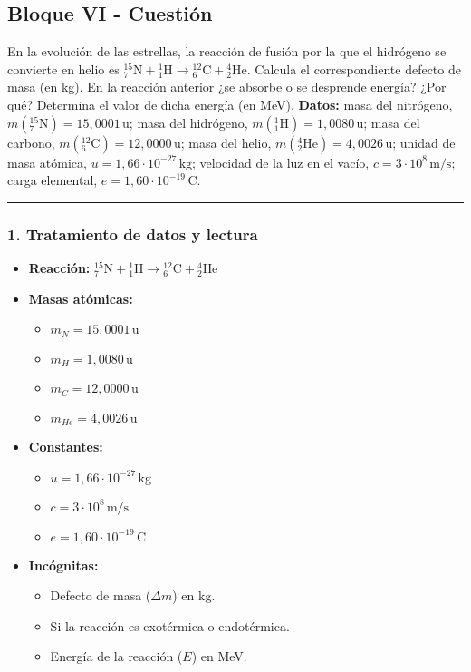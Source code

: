 \subsection{Bloque VI - Cuestión}
\label{subsec:A6_2014_jul_ext}

\begin{cajaenunciado}
En la evolución de las estrellas, la reacción de fusión por la que el hidrógeno se convierte en helio es ${}_{7}^{15}\text{N} + {}_{1}^{1}\text{H} \rightarrow {}_{6}^{12}\text{C} + {}_{2}^{4}\text{He}$. Calcula el correspondiente defecto de masa (en kg). En la reacción anterior ¿se absorbe o se desprende energía? ¿Por qué? Determina el valor de dicha energía (en MeV). 
\textbf{Datos:} masa del nitrógeno, $m\left({}_{7}^{15}\text{N}\right) = 15,0001\,\text{u}$; masa del hidrógeno, $m\left({}_{1}^{1}\text{H}\right)=1,0080\,\text{u}$; masa del carbono, $m\left({}_{6}^{12}\text{C}\right)=12,0000\,\text{u}$; masa del helio, $m\left({}_{2}^{4}\text{He}\right)=4,0026\,\text{u}$; unidad de masa atómica, $u=1,66\cdot10^{-27}\,\text{kg}$; velocidad de la luz en el vacío, $c=3\cdot10^{8}\,\text{m/s}$; carga elemental, $e=1,60\cdot10^{-19}\,\text{C}$. 
\end{cajaenunciado}
\hrule

\subsubsection*{1. Tratamiento de datos y lectura}
\begin{itemize}
    \item \textbf{Reacción:} ${}_{7}^{15}\text{N} + {}_{1}^{1}\text{H} \rightarrow {}_{6}^{12}\text{C} + {}_{2}^{4}\text{He}$
    \item \textbf{Masas atómicas:}
        \begin{itemize}
            \item $m_N = 15,0001\,\text{u}$
            \item $m_H = 1,0080\,\text{u}$
            \item $m_C = 12,0000\,\text{u}$
            \item $m_{He} = 4,0026\,\text{u}$
        \end{itemize}
    \item \textbf{Constantes:}
        \begin{itemize}
            \item $u = 1,66\cdot10^{-27}\,\text{kg}$
            \item $c = 3\cdot10^{8}\,\text{m/s}$
            \item $e = 1,60\cdot10^{-19}\,\text{C}$
        \end{itemize}
    \item \textbf{Incógnitas:}
        \begin{itemize}
            \item Defecto de masa ($\Delta m$) en kg.
            \item Si la reacción es exotérmica o endotérmica.
            \item Energía de la reacción ($E$) en MeV.
        \end{itemize}
\end{itemize}

